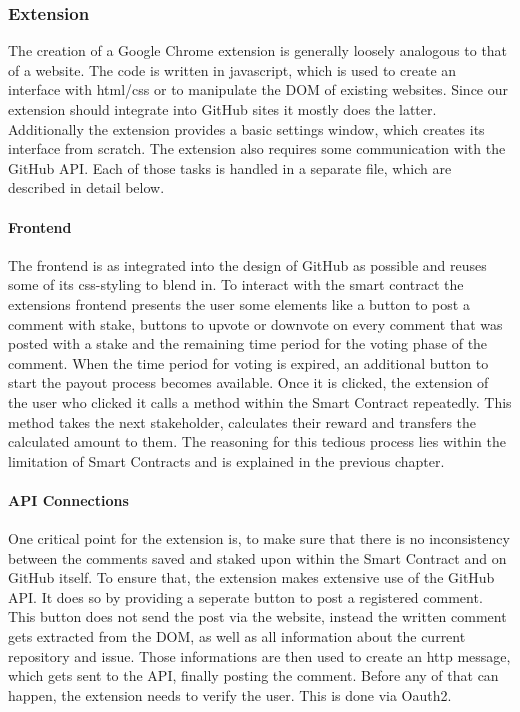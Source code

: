\documentclass[sigconf]{acmart}
\begin{document}
\subsubsection{Extension}

The creation of a Google Chrome extension is generally loosely analogous to that of a website. The code is written in javascript, which is used to create an interface with html/css or to manipulate the DOM of existing websites. Since our extension should integrate into GitHub sites it mostly does the latter. Additionally the extension provides a basic settings window, which creates its interface from scratch. The extension also requires some communication with the GitHub API. Each of those tasks is handled in a separate file, which are described in detail below.

\paragraph{Frontend}

The frontend is as integrated into the design of GitHub as possible and reuses some of its css-styling to blend in. To interact with the smart contract the extensions frontend presents the user some elements like a button to post a comment with stake, buttons to upvote or downvote on every comment that was posted with a stake and the remaining time period for the voting phase of the comment. When the time period for voting is expired, an additional button to start the payout process becomes available. Once it is clicked, the extension of the user who clicked it calls a method within the Smart Contract repeatedly. This method takes the next stakeholder, calculates their reward and transfers the calculated amount to them. The reasoning for this tedious process lies within the limitation of Smart Contracts and is explained in the previous chapter.

\paragraph{API Connections}

One critical point for the extension is, to make sure that there is no inconsistency between the comments saved and staked upon within the Smart Contract and on GitHub itself. To ensure that, the extension makes extensive use of the GitHub API. \cite{rest} It does so by providing a seperate button to post a registered comment. This button does not send the post via the website, instead the written comment gets extracted from the DOM, as well as all information about the current repository and issue. Those informations are then used to create an http message, which gets sent to the API, finally posting the comment.
Before any of that can happen, the extension needs to verify the user. This is done via Oauth2. \cite{oauth}
\end{document}

